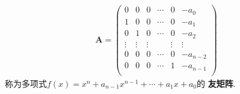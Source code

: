 \documentclass[../../main.tex]{subfiles}%
\begin{document}
\begin{definition}[友矩阵]
\begin{align*}
\boldsymbol{A}=\left( \begin{matrix}
0&		0&		0&		\cdots&		0&		-a_0\\
1&		0&		0&		\cdots&		0&		-a_1\\
0&		1&		0&		\cdots&		0&		-a_2\\
\vdots&		\vdots&		\vdots&		&		\vdots&		\vdots\\
0&		0&		0&		\cdots&		0&		-a_{n-2}\\
0&		0&		0&		\cdots&		1&		-a_{n-1}\\
\end{matrix} \right) 
\end{align*}
称为多项式$f\left( x \right) =x^n+a_{n-1}x^{n-1}+\cdots +a_1x+a_0$的
\textbf{友矩阵}.
\end{definition}
\end{document}
